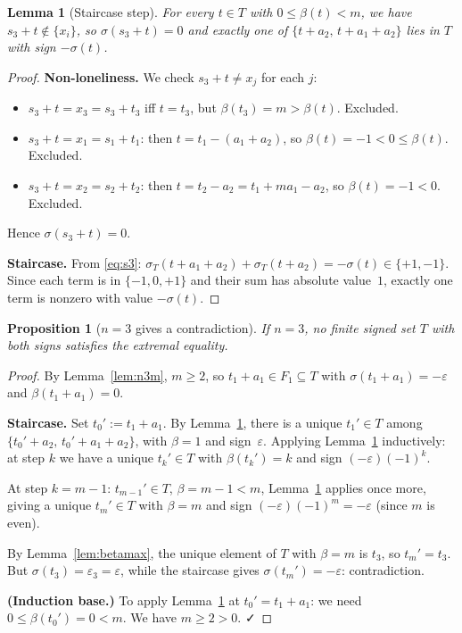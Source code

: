 \documentclass{article}
\newtheorem{lemma}{Lemma}
\newtheorem{prop}{Proposition}
\begin{document}
\begin{lemma}[Staircase step]\label{lem:step}
For every $t\in T$ with $0\le\beta(t)<m$, we have $s_3+t\notin\{x_i\}$,
so $\sigma(s_3+t)=0$ and exactly one of $\{t+a_2,\,t+a_1+a_2\}$ lies in $T$ with
sign $-\sigma(t)$.
\end{lemma}
\begin{proof}
\textbf{Non-loneliness.}
We check $s_3+t\ne x_j$ for each $j$:
\begin{itemize}
\item $s_3+t=x_3=s_3+t_3$ iff $t=t_3$, but $\beta(t_3)=m>\beta(t)$. Excluded.
\item $s_3+t=x_1=s_1+t_1$: then $t=t_1-(a_1+a_2)$, so $\beta(t)=-1<0\le\beta(t)$. Excluded.
\item $s_3+t=x_2=s_2+t_2$: then $t=t_2-a_2=t_1+ma_1-a_2$, so $\beta(t)=-1<0$. Excluded.
\end{itemize}
Hence $\sigma(s_3+t)=0$.

\textbf{Staircase.}
From \eqref{eq:s3}: $\sigma_T(t+a_1+a_2)+\sigma_T(t+a_2)=-\sigma(t)\in\{+1,-1\}$.
Since each term is in $\{-1,0,+1\}$ and their sum has absolute value~$1$, exactly one
term is nonzero with value $-\sigma(t)$.
\end{proof}

\begin{prop}[$n=3$ gives a contradiction]\label{prop:n3}
If $n=3$, no finite signed set $T$ with both signs satisfies the extremal equality.
\end{prop}
\begin{proof}
By Lemma~\ref{lem:n3m}, $m\ge 2$, so $t_1+a_1\in F_1\subseteq T$ with
$\sigma(t_1+a_1)=-\varepsilon$ and $\beta(t_1+a_1)=0$.

\textbf{Staircase.}
Set $t_0':=t_1+a_1$.  By Lemma~\ref{lem:step}, there is a unique $t_1'\in T$ among
$\{t_0'+a_2,\,t_0'+a_1+a_2\}$, with $\beta=1$ and sign~$\varepsilon$.
Applying Lemma~\ref{lem:step} inductively: at step $k$ we have a unique $t_k'\in T$
with $\beta(t_k')=k$ and sign $(-\varepsilon)(-1)^k$.

At step $k=m-1$: $t_{m-1}'\in T$, $\beta=m-1<m$, Lemma~\ref{lem:step} applies once more,
giving a unique $t_m'\in T$ with $\beta=m$ and sign $(-\varepsilon)(-1)^m=-\varepsilon$
(since $m$ is even).

By Lemma~\ref{lem:betamax}, the unique element of $T$ with $\beta=m$ is $t_3$, so
$t_m'=t_3$.  But $\sigma(t_3)=\varepsilon_3=\varepsilon$, while the staircase gives
$\sigma(t_m')=-\varepsilon$: contradiction.

\textbf{(Induction base.)}
To apply Lemma~\ref{lem:step} at $t_0'=t_1+a_1$: we need $0\le\beta(t_0')=0<m$.
We have $m\ge 2>0$. ✓
\end{proof}
\end{document}
